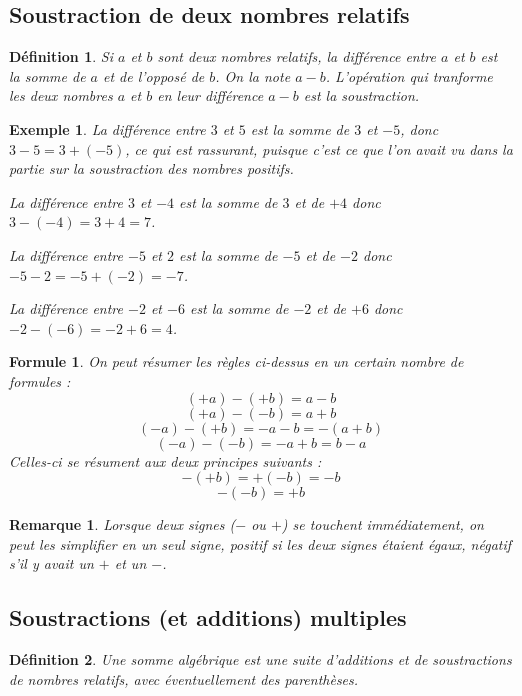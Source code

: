 \documentclass[12 pt]{article}
\theoremstyle{plain}
\newcounter{n}
\numberwithin{n}{section}
\newtheorem*{df}{Définition}
\newtheorem*{rmq}{Remarque}
\newtheorem*{ex}{Exemple}
\newtheorem*{formule}{Formule}
\begin{document}
\subsection{Soustraction de deux nombres relatifs}



\begin{df}Si $a$ et $b$ sont deux nombres relatifs,
la \emph{différence} entre $a$ et $b$ est la somme de $a$ et de l'opposé de $b$. 
On la note $a - b$. L'opération qui tranforme les deux nombres $a$ et $b$ en
leur différence $a - b$ est la \emph{soustraction}.
\end{df}

\begin{ex}
La différence entre $3$ et $5$ est la somme de $3$ et $-5$, donc $3- 5 = 3 + (-5)$, ce qui est rassurant, 
puisque c'est ce que l'on avait vu dans la partie sur la soustraction des nombres positifs. 

La différence entre $3$ et $-4$ est la somme de $3$ et de $+4$ donc $ 3 - (- 4) = 3 + 4 = 7$. 

La différence entre $-5$ et $2$ est la somme de $-5$ et de $-2$ donc $ - 5 - 2 = -5 + (-2) = - 7$. 

La différence entre $-2$ et $-6$ est la somme de $-2$ et de $+6$ donc $-2 - (-6) = -2+6 = 4$. 
\end{ex}

\begin{formule}
On peut résumer les règles ci-dessus en un certain nombre de formules : 
\[ (+a) - (+b) = a - b \]
\[ (+a) - (-b) = a + b \]
\[ (-a) - (+b) = - a - b = - (a + b) \]
\[ (-a) - (-b) =  - a + b = b - a \]
Celles-ci se résument aux deux principes suivants : 
\[ - (+b) = + (-b) = - b\]
\[ - ( - b) = + b\]
\end{formule}
\begin{rmq}
Lorsque deux signes ($-$ ou $+$) se touchent immédiatement, on peut les simplifier en un seul signe, positif si les deux signes étaient égaux, négatif s'il y avait un $+$ et un $-$. 
\end{rmq}

\subsection{Soustractions (et additions) multiples}

\begin{df}
Une \emph{somme algébrique} est une suite d'additions et de soustractions de nombres relatifs, avec 
éventuellement des parenthèses. 
\end{df}
\end{document}
